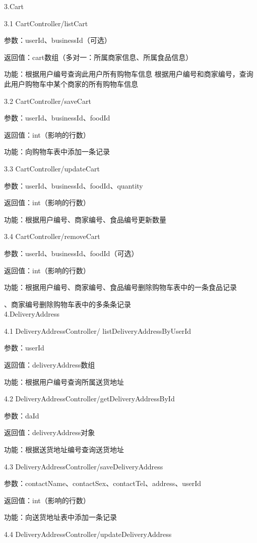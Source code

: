 3.Cart 

3.1 CartController/listCart 

参数：userId、businessId（可选） 

返回值：cart数组（多对一：所属商家信息、所属食品信息） 

功能：根据用户编号查询此用户所有购物车信息 
根据用户编号和商家编号，查询此用户购物车中某个商家的所有购物车信息 

3.2 CartController/saveCart 

参数：userId、businessId、foodId 

返回值：int（影响的行数） 

功能：向购物车表中添加一条记录 

3.3 CartController/updateCart 

参数：userId、businessId、foodId、quantity 

返回值：int（影响的行数） 

功能：根据用户编号、商家编号、食品编号更新数量 

3.4 CartController/removeCart 

参数：userId、businessId、foodId（可选） 

返回值：int（影响的行数） 

功能：根据用户编号、商家编号、食品编号删除购物车表中的一条食品记录 

\qquad{}、商家编号删除购物车表中的多条条记录~\\

4.DeliveryAddress 

4.1 DeliveryAddressController/
listDeliveryAddressByUserId 

参数：userId 

返回值：deliveryAddress数组 

功能：根据用户编号查询所属送货地址 

4.2 DeliveryAddressController/getDeliveryAddressById 

参数：daId 

返回值：deliveryAddress对象 

功能：根据送货地址编号查询送货地址 

4.3 DeliveryAddressController/saveDeliveryAddress 

参数：contactName、contactSex、contactTel、address、userId 

返回值：int（影响的行数） 

功能：向送货地址表中添加一条记录 

4.4 DeliveryAddressController/updateDeliveryAddress 

